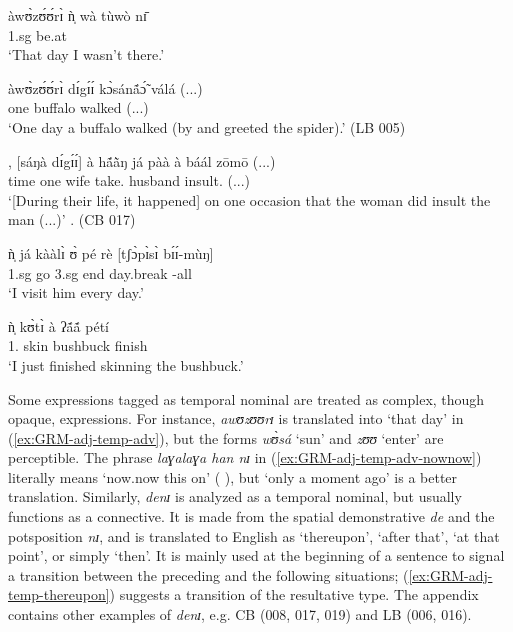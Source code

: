 \begin{exe}
\begin{exe}
\begin{exe}
\ea\label{ex:GRM-adj-temp-adv}

\ea\label{ex:GRM-adj-temp-adv-thatday}

\gll àwʊ̀zʊ́ʊ́rɪ̀ ǹ̩ wà tùwò nɪ̄  \\
{\advt} {\sc 1.sg} {\neg} {be.at} {\postp}\\
\glt `That day I wasn't there.'


\ex\label{ex:GRM-adj-temp-adv-LB5}

\gll àwʊ̀zʊ́ʊ́rɪ̀  dɪ́gɪ́ɪ́           kɔ̀sánã́ɔ̃́   válá    (...)\\
{\advt}  one           buffalo    walked (...) \\
\glt `One day a buffalo walked (by and greeted the spider).' (LB 005)

\ex\label{ex:GRM-adj-temp-adv-CB17}
\gll [dénɪ̀],         [sáŋà      dɪ́gɪ́ɪ́]         à   
hã́ã̀ŋ já   pàà    à     báál         zōmō  (...) \\
{\advt}    time      one           {\art}  wife     {\hab}   take.{\pl} 
{\art} husband insult.{\pl} (...)\\
\glt `[During their life, it happened] on one occasion that the woman
did insult  the man (...)' .  (CB 017)

\ex\label{ex:GRM-adj-temp-adv-everyday}
\gll  ǹ̩ já kààlɪ̀ ʊ̀ pé rè [{tʃɔ̀pɪ̀sɪ̀} bɪ́ɪ́-mùŋ]\\
 {\sc 1.sg}    {\hab} go {\sc 3.sg} end {\foc} day.break {\itr}-all\\
\glt `I visit him every day.'

\ex\label{ex:GRM-adj-temp-adv-nownow}
\gll [làɣálàɣá háǹ nɪ̄] ǹ̩ kʊ̀tɪ̀ à ʔã́ã́ pétí\\
{\advt} {\dem} {\postp} {1.\sg} {skin} {\art} bushbuck  finish\\
\glt `I  just finished skinning the bushbuck.'


\z 
 \z


Some expressions tagged as temporal nominal are treated as complex, though
opaque, expressions. For instance,  {\it awʊzʊʊrɪ} is translated into  `that
day' in (\ref{ex:GRM-adj-temp-adv}), but the forms {\it wʊ̀sá} `sun' and
{\it zʊʊ} `enter'  are perceptible. The phrase {\it laɣalaɣa han nɪ} in
(\ref{ex:GRM-adj-temp-adv-nownow}) literally
means `now.now this on' ({\advt} {\dem} {\postp}), but `only a moment
ago'  is a better translation.  Similarly, {\it denɪ} is analyzed as a
temporal nominal, but usually functions as a connective. It is made from  the
spatial demonstrative {\it de} and the potsposition {\it nɪ}, and is translated 
to
English as `thereupon', `after that', `at that point', or simply `then'. It is
mainly used at the beginning of a sentence to signal a transition  between the
preceding  and the following situations;
(\ref{ex:GRM-adj-temp-thereupon}) suggests a transition of the resultative type.
The appendix contains other examples of {\it denɪ}, e.g.  CB (008, 017, 019)
and 
LB (006, 016).



\end{exe}
\end{exe}
\end{exe}
